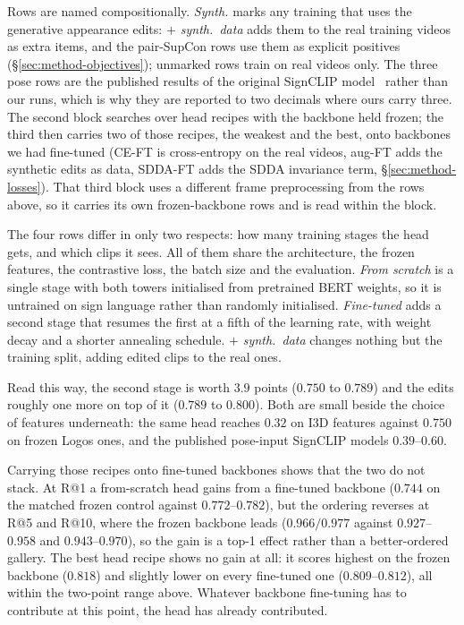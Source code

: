 Rows are named compositionally. \emph{Synth.} marks any training that uses
the generative appearance edits: \emph{$+$ synth.\ data} adds them to the real
training videos as extra items, and the pair-SupCon rows use them as
explicit positives (\S\ref{sec:method-objectives}); unmarked rows train on
real videos only.
The three pose rows are the published results of the original SignCLIP
model~\cite{jiangSignCLIPConnectingText2024} rather than our runs, which
is why they are reported to two decimals where ours carry three. The
second block searches over head recipes with the backbone held frozen;
the third then carries two of those recipes, the weakest and the best,
onto backbones we had fine-tuned (CE-FT is cross-entropy on the real
videos, aug-FT adds the synthetic edits as data, SDDA-FT adds the SDDA
invariance term, \S\ref{sec:method-losses}). That third block uses a
different frame preprocessing from the rows above, so it carries its own
frozen-backbone rows and is read within the block.

The four rows differ in only two respects: how many training stages the
head gets, and which clips it sees. All of them share the architecture,
the frozen features, the contrastive loss, the batch size and the
evaluation. \emph{From scratch} is a single stage with both towers
initialised from pretrained BERT weights, so it is untrained on sign
language rather than randomly initialised. \emph{Fine-tuned} adds a
second stage that resumes the first at a fifth of the learning rate, with
weight decay and a shorter annealing schedule. \emph{$+$ synth.\ data}
changes nothing but the training split, adding edited clips to
the real ones.

Read this way, the second stage is worth $3.9$ points ($0.750$ to
$0.789$) and the edits roughly one more on top of it ($0.789$ to
$0.800$). Both are small beside the choice of
features underneath: the same head reaches $0.32$ on I3D features against
$0.750$ on frozen Logos ones, and the published pose-input SignCLIP
models $0.39$--$0.60$.

Carrying those recipes onto fine-tuned backbones shows that the two do
not stack. At R@1 a from-scratch head gains from a fine-tuned backbone
($0.744$ on the matched frozen control against $0.772$--$0.782$), but the
ordering reverses at R@5 and R@10, where the frozen backbone leads
($0.966/0.977$ against $0.927$--$0.958$ and $0.943$--$0.970$), so the gain
is a top-1 effect rather than a better-ordered gallery. The best head
recipe shows no gain at all: it scores highest on the frozen backbone
($0.818$) and slightly lower on every fine-tuned one ($0.809$--$0.812$),
all within the two-point range above. Whatever backbone fine-tuning has
to contribute at this point, the head has already contributed.

